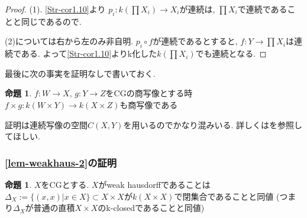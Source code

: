\documentclass[dvipdfmx,a4paper,11pt]{report}
\theoremstyle{definition}
\newtheorem{prop}[thm]{命題}
\begin{document}
\begin{proof}
(1). \ref{Str-cor1.10}より
$p_i : k(\prod X_i) \to X_i$が連続は, $\prod X_i$で連続であることと同じであるので.

(2)については右から左のみ非自明. 
$p_i \circ f $が連続であるとすると, $f : Y \to \prod X_i $は連続である.
よって\ref{Str-cor1.10}よりk化した$k(\prod X_i)$でも連続となる. 
\end{proof}



最後に次の事実を証明なしで書いておく.

 \begin{tcolorbox}
 [colback = white, colframe = green!35!black, fonttitle = \bfseries,breakable = true]
\begin{prop}\cite[Prop 2.20]{Str}
\label{Str-prop2.20}
$f : W \to X$, $g : Y \to Z$をCGの商写像とする時
$f \times g :k( W \times Y) \to k(X \times Z)$も商写像である
\end{prop}
\end{tcolorbox}
証明は連続写像の空間$C(X,Y)$を用いるのでかなり混みいる. 
詳しくは\cite{Str}を参照してほしい. 


\subsubsection{\ref{lem-weakhaus-2}の証明}
\label{subsubsec-CGWH-colim}

 \begin{tcolorbox}
 [colback = white, colframe = green!35!black, fonttitle = \bfseries,breakable = true]
\begin{prop}\cite[Prop2.14]{Str}
\label{Str-prop2.14}
$X$をCGとする.
$X$がweak hausdorffであることは
$\Delta_X := \{ (x,x)| x \in X\}\subset X \times X$が$k(X \times X)$で閉集合であることと同値
(つまり$\Delta_X$が普通の直積$X \times X$のk-closedであることと同値)
\end{prop}
\end{tcolorbox}
\end{document}
